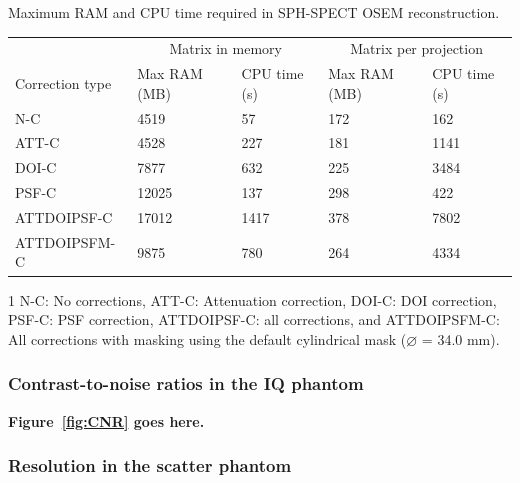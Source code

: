 \documentclass[utf8]{FrontiersinHarvard} %
\begin{document}
\begin{threeparttable}[h!]
\caption{Maximum RAM and CPU time required in SPH-SPECT OSEM reconstruction.\label{tab:computation_cost}}
\footnotesize
\begin{tabular}{l l l l l}
	\hline
	 & \multicolumn{2}{c}{Matrix in memory} & \multicolumn{2}{c}{Matrix per projection} \\ \cline{2-5}
	 Correction type\footnotemark[1] & Max RAM (MB) & CPU time (s) & Max RAM (MB) & CPU time (s) \\ \hline
	 
	 N-C & 4519 & 57 & 172 & 162 \\
	 
	 ATT-C & 4528 & 227 & 181 & 1141 \\
	 
	 DOI-C & 7877 & 632 & 225 & 3484 \\
	 
	 PSF-C & 12025 & 137 & 298 & 422 \\
	 
	 ATTDOIPSF-C & 17012 & 1417 & 378 & 7802 \\
	 
	 ATTDOIPSFM-C & 9875 & 780 & 264 & 4334 \\ \hline
	
\end{tabular}
\begin{tablenotes}
	\item[1]N-C: No corrections, ATT-C: Attenuation correction, DOI-C: DOI correction, PSF-C: PSF correction, ATTDOIPSF-C: all corrections, and ATTDOIPSFM-C: All corrections with masking using the default cylindrical mask ($\diameter$ = 34.0 mm).
\end{tablenotes}
\end{threeparttable}

\subsubsection{Contrast-to-noise ratios in the IQ phantom}



\noindent \textbf{Figure~\ref{fig:CNR} goes here.}

\subsubsection{Resolution in the scatter phantom}
\end{document}
